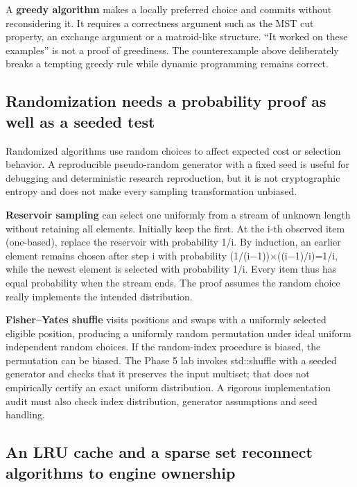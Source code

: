 A \textbf{greedy algorithm} makes a locally preferred choice and commits without reconsidering it. It requires a correctness argument such as the MST cut property, an exchange argument or a matroid-like structure. ``It worked on these examples'' is not a proof of greediness. The counterexample above deliberately breaks a tempting greedy rule while dynamic programming remains correct.

\subsection{Randomization needs a probability proof as well as a seeded test}\label{01-foundations-i-ch008-randomization-needs-a-probability-proof-as-well-as-a-seeded-test}

\hypertarget{01-foundations-i-ch008-randomization-needs-a-probability-proof-as-well-as-a-seeded-test}{}

Randomized algorithms use random choices to affect expected cost or selection behavior. A reproducible pseudo-random generator with a fixed seed is useful for debugging and deterministic research reproduction, but it is not cryptographic entropy and does not make every sampling transformation unbiased.

\textbf{Reservoir sampling} can select one uniformly from a stream of unknown length without retaining all elements. Initially keep the first. At the i-th observed item (one-based), replace the reservoir with probability 1/i. By induction, an earlier element remains chosen after step i with probability (1/(i−1))×((i−1)/i)=1/i, while the newest element is selected with probability 1/i. Every item thus has equal probability when the stream ends. The proof assumes the random choice really implements the intended distribution.

\textbf{Fisher--Yates shuffle} visits positions and swaps with a uniformly selected eligible position, producing a uniformly random permutation under ideal uniform independent random choices. If the random-index procedure is biased, the permutation can be biased. The Phase 5 lab invokes std::shuffle with a seeded generator and checks that it preserves the input multiset; that does not empirically certify an exact uniform distribution. A rigorous implementation audit must also check index distribution, generator assumptions and seed handling.

\subsection{An LRU cache and a sparse set reconnect algorithms to engine ownership}\label{01-foundations-i-ch008-an-lru-cache-and-a-sparse-set-reconnect-algorithms-to-engine-ownership}

